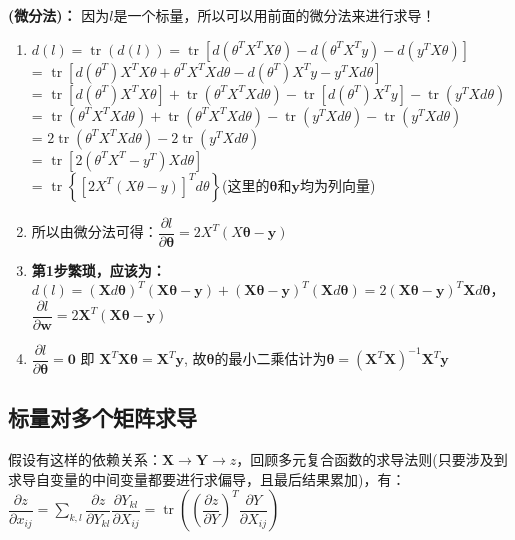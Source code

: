     \textbf{(微分法)：} 因为$l$是一个标量，所以可以用前面的微分法来进行求导！
    \begin{enumerate}
        \item $d(l) = \operatorname{tr}(d(l))= \operatorname{tr}\left[d(\theta^T X^T X \theta)-d(\theta^T X^T y)- d(y^T X \theta)\right]$
        \\
        = $\operatorname{tr}\left[d(\theta^T) X^T X\theta + \theta^T X^T Xd\theta -d(\theta^T)X^T y - y^TXd\theta \right]$
        \\
        = $\operatorname{tr}[d(\theta^T) X^T X\theta] + \operatorname{tr}(\theta^T X^T Xd\theta) - \operatorname{tr}[d(\theta^T)X^T y] -\operatorname{tr}(y^TXd\theta)$
        \\
        = $\operatorname{tr}(\theta^T X^T X d\theta) + \operatorname{tr}(\theta^T X^T Xd\theta) - \operatorname{tr}(y^TXd\theta) -\operatorname{tr}(y^TXd\theta)$
        \\
        = $2\operatorname{tr}(\theta^T X^T X d\theta) - 2\operatorname{tr}(y^TXd\theta)$
        \\
        = $\operatorname{tr}[2 (\theta^T X^T - y^T)X d\theta]$
        \\
        = $\operatorname{tr}\left\{[2 X^T (X \theta - y)]^T d\theta\right\}$(这里的$\bm{\theta}$和$\bm{y}$均为列向量)
        \item 所以由微分法可得：$\dfrac{\partial l}{\partial \bm{\theta}}=2 X^{T}(X \boldsymbol{\theta}-\bm{y})$
        \item \textbf{第1步繁琐，应该为：}$d(l)=(\bm{X} d \bm{\theta})^{T}(\bm{X} \bm{\theta}-\bm{y})+(\bm{X} \bm{\theta}-\bm{y})^{T}(\bm{X} d \bm{\theta})=2(\bm{X} \bm{\theta}-\bm{y})^{T} \bm{X} d \bm{\theta}$，$\dfrac{\partial l}{\partial \bm{w}}=2 \bm{X}^{T}(\bm{X} \bm{\theta}-\boldsymbol{y})$
        \item $\dfrac{\partial l}{\partial \boldsymbol{\theta}}=\mathbf{0}$ 即 $\bm{X}^{T} \bm{X} \boldsymbol{\theta}=\bm{X}^{T} \boldsymbol{y}$, 故$\bm{\theta}$的最小二乘估计为$\boldsymbol{\theta}=\left(\bm{X}^{T} \bm{X}\right)^{-1} \bm{X}^{T} \boldsymbol{y}$
    \end{enumerate}

    \subsection{标量对多个矩阵求导}
    假设有这样的依赖关系：$\mathbf{X} \rightarrow \mathbf{Y} \rightarrow z$，回顾多元复合函数的求导法则(只要涉及到求导自变量的中间变量都要进行求偏导，且最后结果累加)，有：
    \\
    $\dfrac{\partial z}{\partial x_{i j}}=\sum_{k, l} \dfrac{\partial z}{\partial Y_{k l}} \dfrac{\partial Y_{k l}}{\partial X_{i j}}=\operatorname{tr}\left(\left(\dfrac{\partial z}{\partial Y}\right)^{T} \dfrac{\partial Y}{\partial X_{i j}}\right)$


